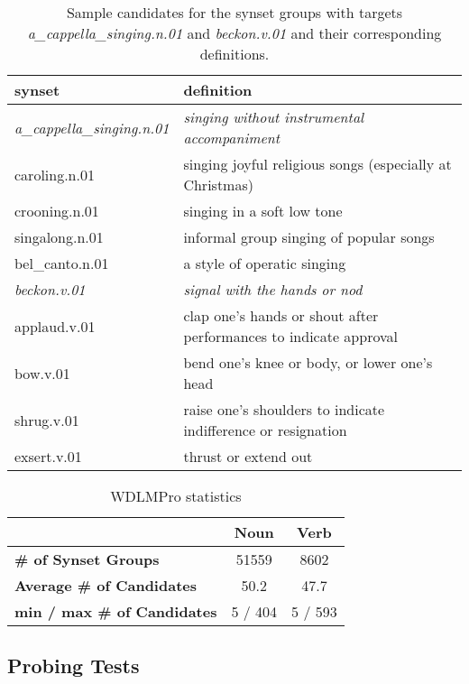\documentclass[11pt,a4paper]{article}
\begin{document}
\begin{table*}
    \centering
    \begin{tabular}{l|l}
    \hline
    \textbf{synset} & \textbf{definition} \\ \hline
    \emph{a\_cappella\_singing.n.01} & \emph{singing without instrumental accompaniment} \\
     caroling.n.01 & singing joyful religious songs (especially at Christmas) \\
     crooning.n.01 & singing in a soft low tone \\
     singalong.n.01 & informal group singing of popular songs \\
     bel\_canto.n.01 & a style of operatic singing \\ \hline
     \emph{beckon.v.01} & \emph{signal with the hands or nod} \\
     applaud.v.01 & clap one's hands or shout after performances to indicate approval \\
     bow.v.01 & bend one's knee or body, or lower one's head \\
     shrug.v.01 & raise one's shoulders to indicate indifference or resignation \\
     exsert.v.01 & thrust or extend out \\ \hline
   
    \end{tabular}
    \caption{Sample candidates for the synset groups with targets \emph{a\_cappella\_singing.n.01} and \emph{beckon.v.01} and their corresponding definitions.} 
    \label{tab:dataset_samples}
\end{table*}


\begin{table}
    \centering
    \begin{tabular}{l|cc}
    \hline
         & \textbf{Noun} & \textbf{Verb} \\ \hline
         \textbf{\# of Synset Groups} & 51559 & 8602 \\
         \textbf{Average \# of Candidates} & 50.2 & 47.7 \\
         \textbf{min / max \# of Candidates} & 5 / 404 & 5 / 593 \\ \hline
    \end{tabular}
    \caption{WDLMPro statistics}
    \label{tab:dataset_stats}
\end{table}

\subsection{Probing Tests}
\end{document}
